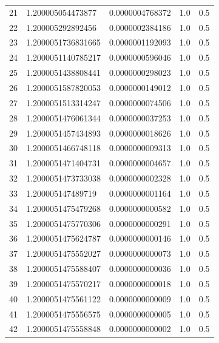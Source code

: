 \documentclass[titlepage,a4paper]{article}
\begin{document}
\begin{center}
\begin{tabular}{| c | l | c | c | c |}
21      & 1.200005054473877  &  0.0000004768372  &  1.0  &  0.5 \\
22      & 1.200005292892456  &  0.0000002384186  &  1.0  &  0.5 \\
23      & 1.2000051736831665  &  0.0000001192093  &  1.0  &  0.5 \\
24      & 1.2000051140785217  &  0.0000000596046  &  1.0  &  0.5 \\
25      & 1.2000051438808441  &  0.0000000298023  &  1.0  &  0.5 \\
26      & 1.2000051587820053  &  0.0000000149012  &  1.0  &  0.5 \\
27      & 1.2000051513314247  &  0.0000000074506  &  1.0  &  0.5 \\
28      & 1.2000051476061344  &  0.0000000037253  &  1.0  &  0.5 \\
29      & 1.2000051457434893  &  0.0000000018626  &  1.0  &  0.5 \\
30      & 1.2000051466748118  &  0.0000000009313  &  1.0  &  0.5 \\
31      & 1.2000051471404731  &  0.0000000004657  &  1.0  &  0.5 \\
32      & 1.2000051473733038  &  0.0000000002328  &  1.0  &  0.5 \\
33      & 1.200005147489719  &  0.0000000001164  &  1.0  &  0.5 \\
34      & 1.2000051475479268  &  0.0000000000582  &  1.0  &  0.5 \\
35      & 1.2000051475770306  &  0.0000000000291  &  1.0  &  0.5 \\
36      & 1.2000051475624787  &  0.0000000000146  &  1.0  &  0.5 \\
37      & 1.2000051475552027  &  0.0000000000073  &  1.0  &  0.5 \\
38      & 1.2000051475588407  &  0.0000000000036  &  1.0  &  0.5 \\
39      & 1.2000051475570217  &  0.0000000000018  &  1.0  &  0.5 \\
40      & 1.2000051475561122  &  0.0000000000009  &  1.0  &  0.5 \\
41      & 1.2000051475556575  &  0.0000000000005  &  1.0  &  0.5 \\
42      & 1.2000051475558848  &  0.0000000000002  &  1.0  &  0.5 \\


           \hline
    \end{tabular}
\end{center}
\end{document}
